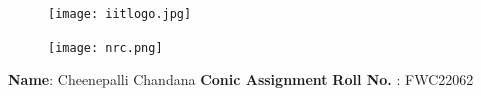 \documentclass[10pt,a4paper]{report}
\begin{document}
\begin{figure}[!tbp]
  \centering
  \begin{minipage}[b]{0.4\textwidth}
    \texttt{[image: iitlogo.jpg]} 
  \end{minipage}
  \hfill
  \vspace{5mm}\begin{minipage}[b]{0.4\textwidth}
\raggedleft  \texttt{[image: nrc.png]}  \

  \end{minipage}\vspace{0.2cm}
\end{figure}
\raggedright \textbf{Name}:\hspace{1mm} Cheenepalli Chandana\hspace{2cm} \Large \textbf{Conic Assignment}\hspace{2.5cm} %
\normalsize \textbf{Roll No.} :\hspace{1mm} FWC22062\vspace{1cm}
\end{document}
